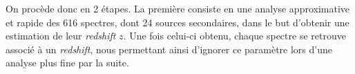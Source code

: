 \documentclass[12pt, a4paper]{article}
\begin{document}
On procède donc en 2 étapes. La première consiste en une analyse approximative et rapide des 616 spectres, dont 24 sources secondaires, dans le but d'obtenir une estimation de leur \textit{redshift} $z$. Une fois celui-ci obtenu, chaque spectre se retrouve associé à un \textit{redshift}, nous permettant ainsi d'ignorer ce paramètre lors d'une analyse plus fine par la suite.


\newpage

\printnoidxglossaries

\newpage

\printbibliography %
\end{document}

